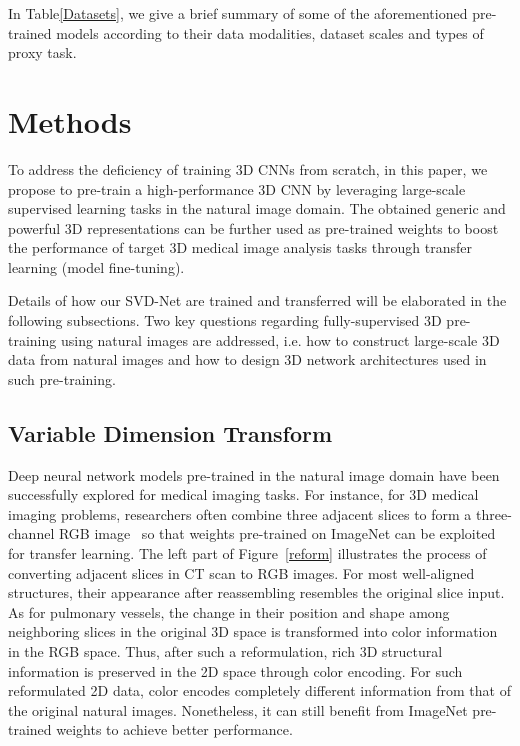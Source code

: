 \documentclass[journal,twoside,web]{ieeecolor}
\begin{document}
In Table\ref{Datasets}, we give a brief summary of some of the aforementioned pre-trained models according to their data modalities, dataset scales and types of proxy task. 


\section{Methods}

To address the deficiency of training 3D CNNs from scratch, in this paper, we propose to pre-train a high-performance 3D CNN by leveraging large-scale supervised learning tasks in the natural image domain. 
The obtained generic and powerful 3D representations can be further used as pre-trained weights to boost the performance of target 3D medical image analysis tasks through transfer learning (model fine-tuning). 

Details of how our SVD-Net are trained and transferred will be elaborated in the following subsections. Two key questions regarding fully-supervised 3D pre-training using natural images are addressed, i.e. how to construct large-scale 3D data from natural images and how to design 3D network architectures used in such pre-training.




\subsection{Variable Dimension Transform}
\label{data_reform}


Deep neural network models pre-trained in the natural image domain have been successfully explored for medical imaging tasks. For instance, for 3D medical imaging problems, researchers often combine three adjacent slices to form a three-channel RGB image~\cite{yan20183d, li2019mvp} so that weights pre-trained on ImageNet can be exploited for transfer learning.
The left part of Figure~\ref{reform} illustrates the process of converting adjacent slices in CT scan to RGB images. For most well-aligned structures, their appearance after reassembling resembles the original slice input. As for pulmonary vessels, the change in their position and shape among neighboring slices in the original 3D space is transformed into color information in the RGB space. Thus, after such a reformulation, rich 3D structural information is preserved in the 2D space through color encoding. For such reformulated 2D data, color encodes completely different information from that of the original natural images. Nonetheless, it can still benefit from ImageNet pre-trained weights to achieve better performance. 
\end{document}
